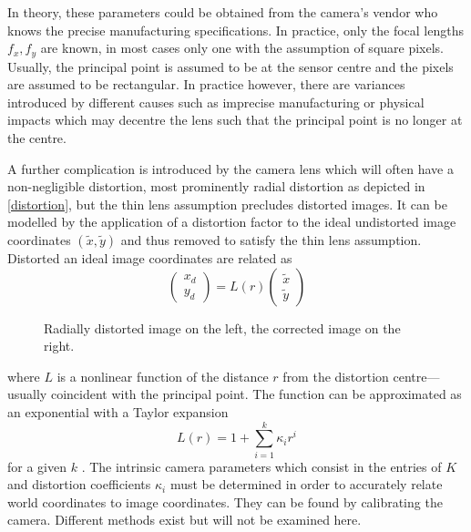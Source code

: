 In theory, these parameters could be obtained from the camera's
vendor who knows the precise manufacturing specifications. In practice, only the
focal lengths $f_x, f_y$ are known, in most cases only one with the assumption
of square pixels. Usually, the principal
point is assumed to be at the sensor centre and the pixels are assumed to be
rectangular. In practice however, there are variances introduced by different
causes such as imprecise manufacturing or physical impacts which may decentre
the lens such that the principal point is no longer at the centre. 

A further complication is introduced by the camera lens which will often have a
non-negligible distortion, most prominently radial distortion as depicted in
\autoref{distortion}, but the thin lens assumption precludes distorted images.  It
can be modelled by the application of a distortion factor to the ideal
undistorted image coordinates $(\tilde{x}, \tilde{y})$
and thus removed to satisfy the thin lens assumption. Distorted an ideal image
coordinates are related as
\begin{equation}
   \begin{pmatrix}
      x_d \\ y_d
   \end{pmatrix} = L(r)\begin{pmatrix}
      \tilde{x} \\ \tilde{y}
   \end{pmatrix}
\end{equation}

\begin{figure}
   {\centering      
      
      \caption[Radial distortion]{Radially distorted image on the left, the corrected image on the
   right.}
   \label{distortion}}
\end{figure}

where $L$ is a nonlinear function of the distance $r$ from the distortion
centre---usually coincident with the principal point. The function can be
approximated as an exponential with a Taylor expansion
\begin{equation}
   L(r) = 1 + \sum\limits_{i=1}^k \kappa_i r^i
\end{equation}
for a given $k$ \citep[see][ch. 7.4]{h&z2004}. The intrinsic camera
parameters which consist in the entries of $K$ and distortion coefficients
$\kappa_i$ must be determined in order to accurately relate world coordinates to
image coordinates. They can be found by calibrating the camera. Different
methods exist \citep[e.g][]{zhang2000} but will not be examined here.

